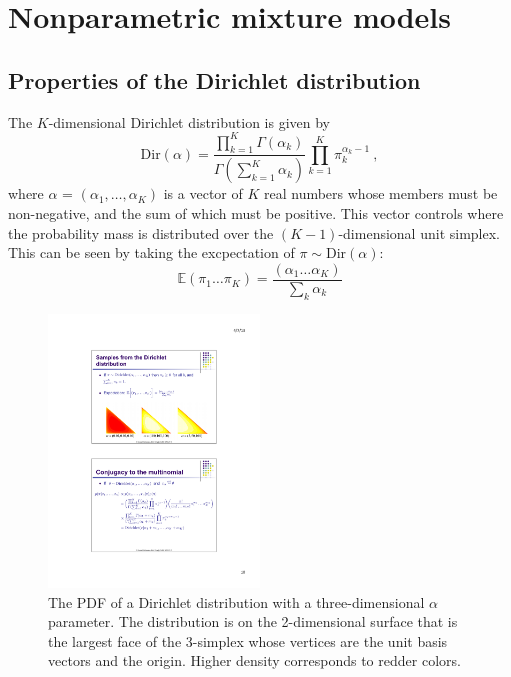 \documentclass[twoside]{article}
\newcommand{\Dir}{\mathrm{Dir}}
\begin{document}
\section{Nonparametric mixture models}

\subsection{Properties of the Dirichlet distribution}
The $K$-dimensional Dirichlet distribution is given by
\[
\Dir(\alpha) = \frac{\prod_{k=1}^{K} \Gamma{(\alpha_k)}}{\Gamma{(\sum_{k=1}^{K} \alpha_k)}} \prod_{k=1}^{K} \pi_{k}^{\alpha_k - 1} \:,
\]
where $\alpha$ = $(\alpha_1, \dots, \alpha_K)$ is a vector of $K$ real numbers whose members must be non-negative, and the sum of which must be positive.  This vector controls where the probability mass is distributed over the $(K-1)$-dimensional unit simplex.  This can be seen by taking the excpectation of $\pi \sim \Dir(\alpha)$:
$$ \mathbb{E}(\pi_1 \dots \pi_K) = \frac{(\alpha_1 \dots \alpha_K)}{\sum_k \alpha_k} $$ 

\begin{figure}[htbp] %
   \centering
   \includegraphics[width=0.5\textwidth]{dirichlet.pdf} 
   \caption{The PDF of a Dirichlet distribution with a three-dimensional $\alpha$ parameter.  The distribution is on the 2-dimensional surface that is the largest face of the 3-simplex whose vertices are the unit basis vectors and the origin.  Higher density corresponds to redder colors.}
   \label{fig:diricheltpdfs}
\end{figure}
\end{document}
